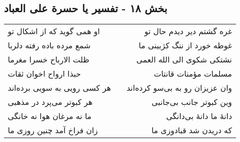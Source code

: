 \begin{center}
\section*{بخش ۱۸ - تفسیر یا حسرة علی العباد}
\label{sec:sh018}
\begin{longtable}{l p{0.5cm} r}
او همی گوید که از اشکال تو
&&
غره گشتم دیر دیدم حال تو
\\
شمع مرده باده رفته دلربا
&&
غوطه خورد از ننگ کژبینی ما
\\
ظلت الارباح خسرا مغرما
&&
نشتکی شکوی الی الله العمی
\\
حبذا ارواح اخوان ثقات
&&
مسلمات مؤمنات قانتات
\\
هر کسی رویی به سویی برده‌اند
&&
وان عزیزان رو به بی‌سو کرده‌اند
\\
هر کبوتر می‌پرد در مذهبی
&&
وین کبوتر جانب بی‌جانبی
\\
ما نه مرغان هوا نه خانگی
&&
دانهٔ ما دانهٔ بی‌دانگی
\\
زان فراخ آمد چنین روزی ما
&&
که دریدن شد قبادوزی ما
\\
\end{longtable}
\end{center}
